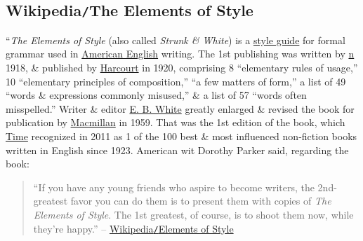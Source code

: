 \documentclass{article}
\begin{document}
\subsection{Wikipedia{\tt/}The Elements of Style}
``{\it The Elements of Style} (also called {\it Strunk \& White}) is a \href{https://en.wikipedia.org/wiki/Style_guide}{style guide} for formal grammar used in \href{https://en.wikipedia.org/wiki/American_English}{American English} writing. The 1st publishing was written by \href{https://en.wikipedia.org/wiki/William_Strunk_Jr.} n 1918, \& published by \href{https://en.wikipedia.org/wiki/Harcourt_(publisher)}{Harcourt} in 1920, comprising 8 ``elementary rules of usage,'' 10 ``elementary principles of composition,'' ``a few matters of form,'' a list of 49 ``words \& expressions commonly misused,'' \& a list of 57 ``words often misspelled.'' Writer \& editor \href{https://en.wikipedia.org/wiki/E._B._White}{E. B. White} greatly enlarged \& revised the book for publication by \href{https://en.wikipedia.org/wiki/Macmillan_Publishers}{Macmillan} in 1959. That was the 1st edition of the book, which \href{https://en.wikipedia.org/wiki/Time_(magazine)}{Time} recognized in 2011 as 1 of the 100 best \& most influenced non-fiction books written in English since 1923. American wit Dorothy Parker said, regarding the book:
\begin{quote}
	``If you have any young friends who aspire to become writers, the 2nd-greatest favor you can do them is to present them with copies of {\it The Elements of Style}. The 1st greatest, of course, is to shoot them now, while they're happy.'' -- \href{https://en.wikipedia.org/wiki/The_Elements_of_Style}{Wikipedia{\tt/}Elements of Style}
\end{quote}
\end{document}
